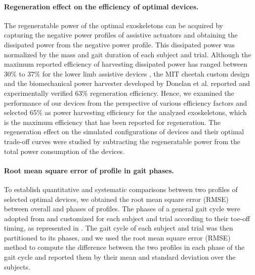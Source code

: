 \documentclass[10pt,letterpaper]{article}
\begin{document}
\paragraph*{Regeneration effect on the efficiency of optimal devices.} 
The regeneratable power of the optimal exoskeletons can be acquired by capturing the negative power profiles of assistive actuators and obtaining the dissipated power from the negative power profile. This dissipated power was normalized by the mass and gait duration of each subject and trial. Although the maximum reported efficiency of harvesting dissipated power has ranged between 30\% to 37\% for the lower limb assistive devices \cite{140}, the MIT cheetah custom design \cite{144,145} and the biomechanical power harvester developed by Donelan et al. \cite{143} reported and experimentally verified 63\% regeneration efficiency. Hence, we examined the performance of our devices from the perspective of various efficiency factors and selected 65\% as power harvesting efficiency for the analyzed exoskeletons, which is the maximum efficiency that has been reported for regeneration. The regeneration effect on the simulated configurations of devices and their optimal trade-off curves were studied by subtracting the regeneratable power from the total power consumption of the devices.\\
\paragraph*{Root mean square error of profile in gait phases.}  To establish quantitative and systematic comparisons between two profiles of selected optimal devices, we obtained the root mean square error (RMSE) between overall and phases of profiles. The phases of a general gait cycle were adopted from \cite{150,161} and customized for each subject and trial according to their toe-off timing, as represented in . The gait cycle of each subject and trial was then partitioned to its phases, and we used the root mean square error (RMSE) method to compute the difference between the two profiles in each phase of the gait cycle and reported them by their mean and standard deviation over the subjects.
\end{document}
